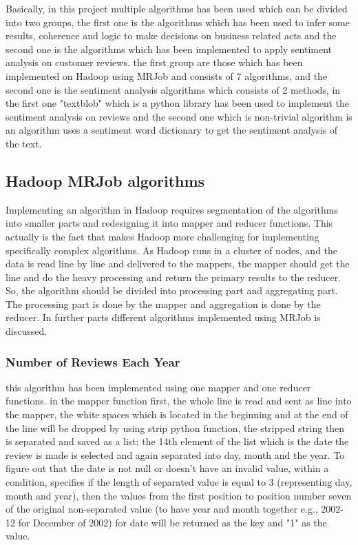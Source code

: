 Basically, in this project multiple algorithms has been used which can be divided into two groups, the first one is the algorithms which has been used to infer some results, coherence and logic to make decisions on business related acts and the second one is the algorithms which has been implemented to apply sentiment analysis on customer reviews. the first group are those which has been implemented on Hadoop using MRJob and consists of 7 algorithms, and the second one is the sentiment analysis algorithms which consists of 2 methods, in the first one "textblob" which is a python library has been used to implement the sentiment analysis on reviews and the second one which is non-trivial algorithm is an algorithm uses a sentiment word dictionary to get the sentiment analysis of the text.
\subsection{Hadoop MRJob algorithms}
Implementing an algorithm in Hadoop requires segmentation of the algorithms into smaller parts and redesigning it into mapper and reducer functions. This actually is the fact that makes Hadoop more challenging for implementing specifically complex algorithms. As Hadoop runs in a cluster of nodes, and the data is read line by line and delivered to the mappers, the mapper should get the line and do the heavy processing and return the primary results to the reducer. So, the algorithm should be divided into processing part and aggregating part. The processing part is done by the mapper and aggregation is done by the reducer. In further parts different algorithms implemented using MRJob is discussed.
\subsubsection{Number of Reviews Each Year} this algorithm has been implemented using one mapper and one reducer functions. in the mapper function first, the whole line is read and sent as line into the mapper, the white spaces which is located in the beginning and at the end of the line will be dropped by using strip  python function, the stripped string then is separated and saved as a list; the 14th element of the list which is the date the review is made is selected and again separated into day, month and the year. To figure out that the date is not null or doesn't have an invalid value, within a condition, specifies if the length of separated value is equal to 3 (representing day, month and year), then the values from the first position to position number seven of the original non-separated value (to have year and month together e.g., 2002-12 for December of 2002) for date will be returned as the key and "1" as the value.


